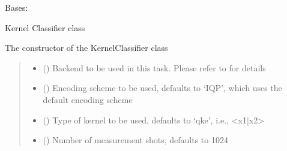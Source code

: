 \documentclass[letterpaper,10pt,english]{sphinxmanual}
\begin{document}
\begin{fulllineitems}
\label{\detokenize{qcompute_qapp.algorithm:qcompute_qapp.algorithm.KernelClassifier}}
\pysigstartsignatures
{}
\pysigstopsignatures
\sphinxAtStartPar
Bases: 

\sphinxAtStartPar
Kernel Classifier class

\sphinxAtStartPar
The constructor of the KernelClassifier class
\begin{quote}\begin{description}
\begin{itemize}
\item {} 
\sphinxAtStartPar
{} () \textendash{} Backend to be used in this task. Please refer to 
for details

\item {} 
\sphinxAtStartPar
{} () \textendash{} Encoding scheme to be used, defaults to ‘IQP’, which uses the default encoding scheme

\item {} 
\sphinxAtStartPar
{} () \textendash{} Type of kernel to be used, defaults to ‘qke’, i.e., \textless{}x1|x2\textgreater{}

\item {} 
\sphinxAtStartPar
{} () \textendash{} Number of measurement shots, defaults to 1024


\end{itemize}
\end{description}
\end{quote}
\end{fulllineitems}
\end{document}
